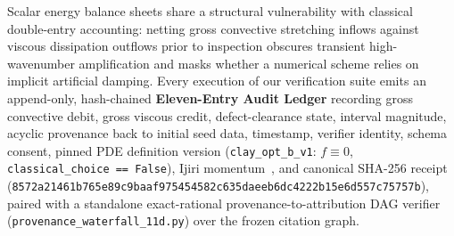 \documentclass[11pt]{article}
\theoremstyle{plain}
\theoremstyle{definition}
\begin{document}
Scalar energy balance sheets share a structural vulnerability with classical double-entry accounting: netting gross convective stretching inflows against viscous dissipation outflows prior to inspection obscures transient high-wavenumber amplification and masks whether a numerical scheme relies on implicit artificial damping. Every execution of our verification suite emits an append-only, hash-chained \textbf{Eleven-Entry Audit Ledger} recording gross convective debit, gross viscous credit, defect-clearance state, interval magnitude, acyclic provenance back to initial seed data, timestamp, verifier identity, schema consent, pinned PDE definition version (\texttt{clay\_opt\_b\_v1}: $f \equiv 0$, \texttt{classical\_choice == False}), Ijiri momentum~\cite{ijiri1989}, and canonical SHA-256 receipt~\cite{grigg2005} (\texttt{8572a21461b765e8\allowbreak 9c9baaf975454582\allowbreak c635daeeb6dc4222\allowbreak b15e6d557c75757b}), paired with a standalone exact-rational provenance-to-attribution DAG verifier (\texttt{provenance\_waterfall\_11d.py}) over the frozen citation graph.
\end{document}

